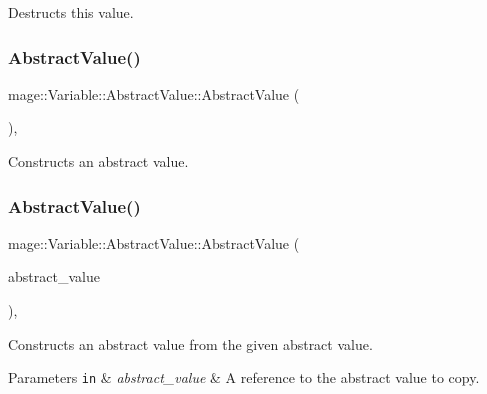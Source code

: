 Destructs this value. \hypertarget{structmage_1_1_variable_1_1_abstract_value_a0a96662d36697af8a17b88f6a2d8efca}{}\label{structmage_1_1_variable_1_1_abstract_value_a0a96662d36697af8a17b88f6a2d8efca} 
\subsubsection{\texorpdfstring{Abstract\+Value()}{AbstractValue()}\hspace{0.1cm}{\footnotesize\ttfamily [1/3]}}
{\footnotesize\ttfamily mage\+::\+Variable\+::\+Abstract\+Value\+::\+Abstract\+Value (\begin{DoxyParamCaption}{ }\end{DoxyParamCaption})\hspace{0.3cm}{\ttfamily [protected]}, {\ttfamily [default]}}

Constructs an abstract value. \hypertarget{structmage_1_1_variable_1_1_abstract_value_a09123ab568948a1a8bc7911c65fda422}{}\label{structmage_1_1_variable_1_1_abstract_value_a09123ab568948a1a8bc7911c65fda422} 
\subsubsection{\texorpdfstring{Abstract\+Value()}{AbstractValue()}\hspace{0.1cm}{\footnotesize\ttfamily [2/3]}}
{\footnotesize\ttfamily mage\+::\+Variable\+::\+Abstract\+Value\+::\+Abstract\+Value (\begin{DoxyParamCaption}\item[{const \hyperlink{structmage_1_1_variable_1_1_abstract_value}{Abstract\+Value} \&}]{abstract\+\_\+value }\end{DoxyParamCaption})\hspace{0.3cm}{\ttfamily [protected]}, {\ttfamily [default]}}

Constructs an abstract value from the given abstract value.


\begin{DoxyParams}[1]{Parameters}
\mbox{\tt in}  & {\em abstract\+\_\+value} & A reference to the abstract value to copy. \\
\hline
\end{DoxyParams}
\hypertarget{structmage_1_1_variable_1_1_abstract_value_af2decac4e5b5b52c3e6973b39a2dec5b}{}\label{structmage_1_1_variable_1_1_abstract_value_af2decac4e5b5b52c3e6973b39a2dec5b} 
